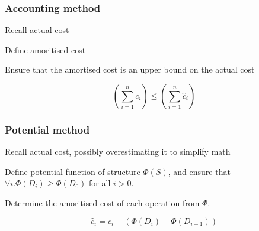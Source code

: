 \documentclass[10pt, a4paper,landscape]{article}
\begin{document}
\begin{multicols*}{4}


\subsubsection{Accounting method}
\begin{compactitem}
    \item Recall actual cost
    \item Define amoritised cost
    \item Ensure that the amortised cost is an upper bound on the actual cost
\end{compactitem}

\[
  (\sum_{i =1}^{n} c_i) \leq (\sum_{i =1}^{n} \hat{c}_i) 
\]

\subsubsection{Potential method}
\begin{compactitem}
    \item Recall actual cost, possibly overestimating it to simplify math
    \item Define potential function of structure $\Phi(S)$, and ensure that $\forall i. \Phi(D_i) \geq \Phi(D_0)$ for all $i > 0$.
    \item Determine the amoritised cost of each operation from $\Phi$.
\end{compactitem}

\[\hat{c}_i = c_i + (\Phi(D_i) - \Phi(D_{i - 1}))\]


\end{multicols*}
\end{document}
